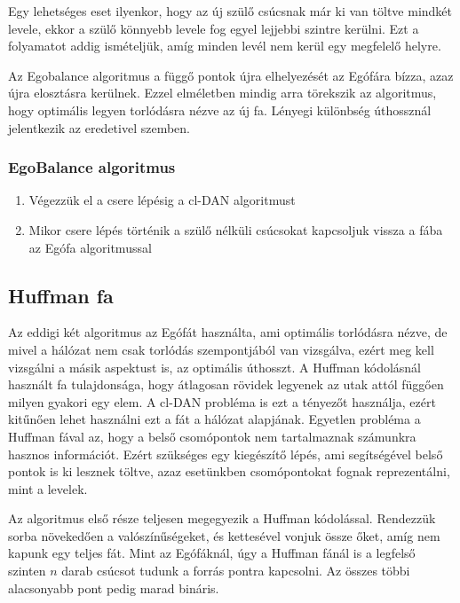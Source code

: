 \documentclass[12pt]{report}
\begin{document}
\pagebreak

Egy lehetséges eset ilyenkor, hogy az új szülő csúcsnak már ki van töltve mindkét levele, ekkor a szülő könnyebb levele fog egyel lejjebbi szintre kerülni.
Ezt a folyamatot addig ismételjük, amíg minden levél nem kerül egy megfelelő helyre.

Az Egobalance algoritmus a függő pontok újra elhelyezését az Egófára bízza, azaz újra elosztásra kerülnek.
Ezzel elméletben mindig arra törekszik az algoritmus, hogy optimális legyen torlódásra nézve az új fa.
Lényegi különbség úthossznál jelentkezik az eredetivel szemben.

\subsubsection{EgoBalance algoritmus}
\begin{enumerate}
	\item Végezzük el a csere lépésig a cl-DAN algoritmust
	\item Mikor csere lépés történik a szülő nélküli csúcsokat kapcsoljuk vissza a fába az Egófa algoritmussal
\end{enumerate}

\subsection{Huffman fa}

Az eddigi két algoritmus az Egófát \cite{avin_demand-aware_nodate} használta, ami optimális torlódásra nézve, de mivel a hálózat nem csak torlódás szempontjából van vizsgálva, ezért meg kell vizsgálni a másik aspektust is, az optimális úthosszt.
A Huffman kódolásnál \cite{huf52} használt fa tulajdonsága, hogy átlagosan rövidek legyenek az utak attól függően milyen gyakori egy elem.
A cl-DAN probléma is ezt a tényezőt használja, ezért kitűnően lehet használni ezt a fát a hálózat alapjának.
Egyetlen probléma a Huffman fával az, hogy a belső csomópontok nem tartalmaznak számunkra hasznos információt.
Ezért szükséges egy kiegészítő lépés, ami segítségével belső pontok is ki lesznek töltve, azaz esetünkben csomópontokat fognak reprezentálni, mint a levelek.

Az algoritmus első része teljesen megegyezik a Huffman kódolással.
Rendezzük sorba növekedően a valószínűségeket, és kettesével vonjuk össze őket, amíg nem kapunk egy teljes fát.
Mint az Egófáknál, úgy a Huffman fánál is a legfelső szinten \(n\) darab csúcsot tudunk a forrás pontra kapcsolni.
Az összes többi alacsonyabb pont pedig marad bináris.
\end{document}
